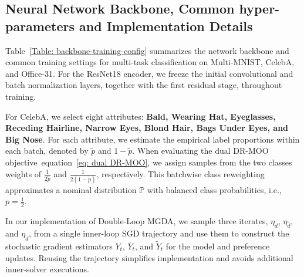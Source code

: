 \documentclass[twoside]{article} %
\def\eqref#1{equation~\ref{#1}}
\theoremstyle{plain}
\theoremstyle{definition}
\theoremstyle{remark}
\begin{document}
\subsection{Neural Network Backbone, Common hyper-parameters and Implementation Details}
Table~\ref{Table: backbone-training-config} summarizes the network backbone and common training settings for multi-task classification on Multi-MNIST, CelebA, and Office-31. For the ResNet18 encoder, we freeze the initial convolutional and batch normalization layers, together with the first residual stage, throughout training.

For CelebA, we select eight attributes: \textbf{Bald, Wearing Hat, Eyeglasses, Receding Hairline, Narrow Eyes, Blond Hair, Bags Under Eyes, and Big Nose}. For each attribute, we estimate the empirical label proportions within each batch, denoted by $\tilde{p}$ and $1-\tilde{p}$. When evaluating the dual DR-MOO objective~\eqref{eq: dual DR-MOO}, we assign samples from the two classes weights of $\frac{1}{2\tilde{p}}$ and $\frac{1}{2(1-\tilde{p})}$, respectively. This batchwise class reweighting approximates a nominal distribution $\mathbb{P}$ with balanced class probabilities, i.e., $p=\frac{1}{2}$.

In our implementation of Double-Loop MGDA, we sample three iterates, $\eta_d$, $\eta_{\bar d}$, and $\eta_{\tilde d}$, from a single inner-loop SGD trajectory and use them to construct the stochastic gradient estimators $Y_t$, $\bar Y_t$, and $\tilde Y_t$ for the model and preference updates. Reusing the trajectory simplifies implementation and avoids additional inner-solver executions.
\end{document}
